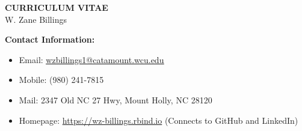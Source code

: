\documentclass[11pt]{article}
\begin{document}
\begin{center}
\large{
	{\bf CURRICULUM VITAE} \\
	W. Zane Billings \\}
	\hrulefill
\end{center}

\normalsize

{\bf Contact Information:}
\begin{itemize}[noitemsep]
\item Email: \href{mailto:wzbillings1@catamount.wcu.edu}{\ul{wzbillings1@catamount.wcu.edu}}
\item Mobile: (980) 241-7815
\item Mail: 2347 Old NC 27 Hwy, Mount Holly, NC 28120
\item Homepage: \url{https://wz-billings.rbind.io} (Connects to GitHub and LinkedIn)
\end{itemize}

\vspace{0.2in}


\vspace{0.2in}


\vspace{0.2in}


\vspace{0.2in}


\vspace{0.2in}


\vspace{0.2in}


\vspace{0.2in}

\end{document}
